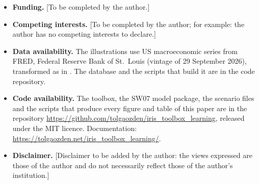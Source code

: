 \documentclass[pdflatex,sn-basic]{sn-jnl}
\begin{document}
\begin{itemize}
\item \textbf{Funding.} [To be completed by the author.]
\item \textbf{Competing interests.} [To be completed by the author; for example: the author has
      no competing interests to declare.]
\item \textbf{Data availability.} The illustrations use US macroeconomic series from FRED, Federal
      Reserve Bank of St.\ Louis (vintage of 29 September 2026), transformed as in
      \citet{smets2007}. The database and the scripts that build it are in the code repository.
\item \textbf{Code availability.} The toolbox, the SW07 model package, the scenario files and the
      scripts that produce every figure and table of this paper are in the repository
      \url{https://github.com/tolgaozden/iris_toolbox_learning}, released under the MIT licence.
      Documentation:
      \url{https://tolgaozden.net/iris_toolbox_learning/}.
\item \textbf{Disclaimer.} [Disclaimer to be added by the author: the views expressed are those of
      the author and do not necessarily reflect those of the author's institution.]
\end{itemize}
\end{document}
